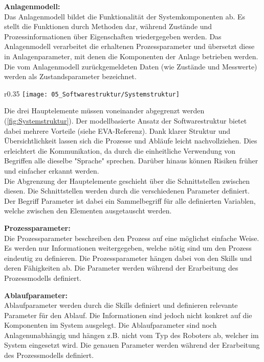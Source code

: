 	\textbf{Anlagenmodell:}
	\vspace{2mm} 
	\\
	Das Anlagenmodell bildet die Funktionalität der Systemkomponenten ab. Es stellt die Funktionen durch Methoden dar, während Zustände und Prozessinformationen über Eigenschaften wiedergegeben werden. Das Anlagenmodell verarbeitet die erhaltenen Prozessparameter und übersetzt diese in Anlagenparameter, mit denen die Komponenten der Anlage betrieben werden. Die vom Anlagenmodell zurückgemeldeten Daten (wie Zustände und Messwerte) werden als Zustandsparameter bezeichnet. 
	\\
	\vspace{-13mm}
	\begin{wrapfigure}{r}{0.35\textwidth}
		\centering
		\texttt{[image: 05\_Softwarestruktur/Systemstruktur]}
		\captionsetup{justification=centering}
		\caption{Kraftsensor}
		\label{fig:Systemstruktur}
	\end{wrapfigure} \par
	Die drei Hauptelemente müssen voneinander abgegrenzt werden (\ref{fig:Systemstruktur}). Der modellbasierte Ansatz der Softwarestruktur bietet dabei mehrere Vorteile (siehe EVA-Referenz). Dank klarer Struktur und Übersichtlichkeit lassen sich die Prozesse und Abläufe leicht nachvollziehen. Dies erleichtert die Kommunikation, da durch die einheitliche Verwendung von Begriffen alle dieselbe "Sprache" sprechen. Darüber hinaus können Risiken früher und einfacher erkannt werden.
	\\
	Die Abgrenzung der Hauptelemente geschieht über die Schnittstellen zwischen diesen. Die Schnittstellen werden durch die verschiedenen Parameter definiert. Der Begriff Parameter ist dabei ein Sammelbegriff für alle definierten Variablen, welche zwischen den Elementen ausgetauscht werden.
	
	\textbf{Prozessparameter:}
	\vspace{2mm} 
	\\
	Die Prozessparameter beschreiben den Prozess auf eine möglichst einfache Weise. Es werden nur Informationen weitergegeben, welche nötig sind um den Prozess eindeutig zu definieren. Die Prozessparameter hängen dabei von den Skills und deren Fähigkeiten ab. Die Parameter werden während der Erarbeitung des Prozessmodells definiert.
	
	\textbf{Ablaufparameter:}
	\vspace{2mm} 
	\\
	Ablaufparameter werden durch die Skills definiert und definieren relevante Parameter für den Ablauf. Die Informationen sind jedoch nicht konkret auf die Komponenten im System ausgelegt. Die Ablaufparameter sind noch Anlagenunabhängig und hängen z.B. nicht vom Typ des Roboters ab, welcher im System eingesetzt wird. Die genauen Parameter werden während der Erarbeitung des Prozessmodells definiert.
	
